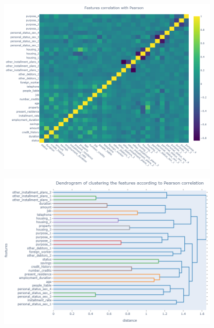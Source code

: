 \documentclass[letterpaper]{article}
\begin{document}
	\begin{figure}[h]
		\centering
		\includegraphics[width=.85\textwidth]{images/correlation_pearson.png}
		\label{fig:12}
	\end{figure}
	\begin{figure}[h]
		\centering
		\includegraphics[width=.85\textwidth]{images/dendrogram_pearson.png}
		\label{fig:13}
	\end{figure}
	
\end{document}
